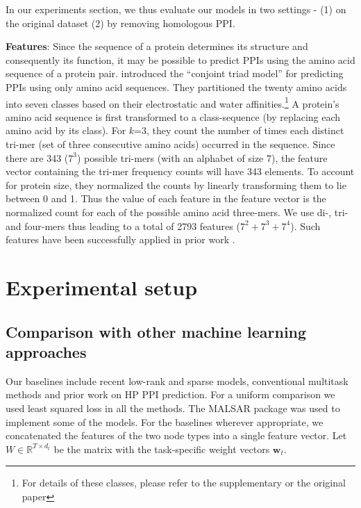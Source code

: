 \documentclass{bioinfo}
\begin{document}
In our experiments section, we thus evaluate our models in two settings - (1) on the original dataset (2) by removing homologous PPI.


\noindent\textbf{Features}: 
Since the sequence of a protein determines its structure and consequently its function, it may be possible to predict PPIs using the amino acid sequence of a protein pair. \cite{shen:2007} introduced the ``conjoint triad model'' for predicting PPIs using only amino acid sequences. They partitioned the twenty amino acids into seven classes based on their electrostatic and water affinities.\footnote{For details of these classes, please refer to the supplementary or the original paper}
A protein's amino acid sequence is first transformed to a class-sequence (by replacing each amino acid by its class).
For $k$=3, they count the number of times each distinct tri-mer (set of three consecutive amino acids) occurred in the sequence.
Since there are 343 ($7^3$) possible tri-mers (with an alphabet of size 7), the feature vector containing the tri-mer frequency counts will have 343 elements.
To account for protein size, they normalized the counts by linearly transforming them to lie between 0 and 1.
Thus the value of each feature in the feature vector is the normalized count for each of the possible amino acid three-mers. We use di-, tri- and four-mers thus leading to a total of 2793 features ($7^2 + 7^3 + 7^4$).
Such features have been successfully applied in prior work \citep{dyer07,me_ismb_2013}.

\section{Experimental setup}

\subsection{Comparison with other machine learning approaches}
\label{mlmethods}
Our baselines include recent low-rank and sparse models, conventional multitask methods and prior work on HP PPI prediction. For a uniform comparison we used least squared loss in all the methods. The MALSAR \cite{malsar} package was used to implement some of the models. For the baselines wherever appropriate, we concatenated the features of the two node types into a single feature vector. Let $W \in \mathbb{R}^{T \times d_t}$ be the matrix with the task-specific weight vectors $\mathbf{w}_t$.
 
\end{document}

